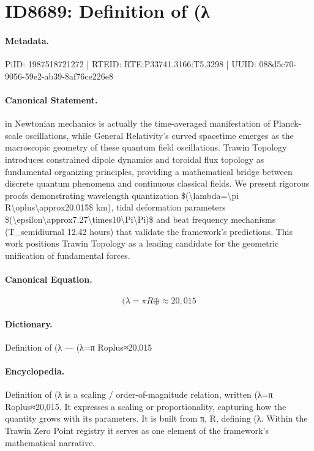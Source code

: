 \section*{ID8689: Definition of (λ}
\paragraph{Metadata.}
PiID: 1987518721272 | RTEID: RTE:P33741.3166:T5.3298 | UUID: 088d5c70-9056-59e2-ab39-8af76ce226e8

\paragraph{Canonical Statement.}
in Newtonian mechanics is actually the time-averaged manifestation of Planck-scale oscillations, while General Relativity's curved spacetime emerges as the macroscopic geometry of these quantum field oscillations. Trawin Topology introduces constrained dipole dynamics and toroidal flux topology as fundamental organizing principles, providing a mathematical bridge between discrete quantum phenomena and continuous classical fields. We present rigorous proofs demonstrating wavelength quantization \$(\textbackslash{}lambda=\textbackslash{}pi R\textbackslash{}oplus\textbackslash{}approx20,015\$ km), tidal deformation parameters \$(\textbackslash{}epsilon\textbackslash{}approx7.27\textbackslash{}times10\textbackslash{}Pi\textbackslash{}Pi)\$ and beat frequency mechanisms (T\_semidiurnal 12.42 hours) that validate the framework's predictions. This work positions Trawin Topology as a leading candidate for the geometric unification of fundamental forces.

\paragraph{Canonical Equation.}
\[
(\lambda=\pi R\oplus\approx20,015
\]

\paragraph{Dictionary.}
Definition of (λ — (λ=π Roplus≈20,015

\paragraph{Encyclopedia.}
Definition of (λ is a scaling / order-of-magnitude relation, written (λ=π Roplus≈20,015. It expresses a scaling or proportionality, capturing how the quantity grows with its parameters. It is built from π, R, defining (λ. Within the Trawin Zero Point registry it serves as one element of the framework's mathematical narrative.
